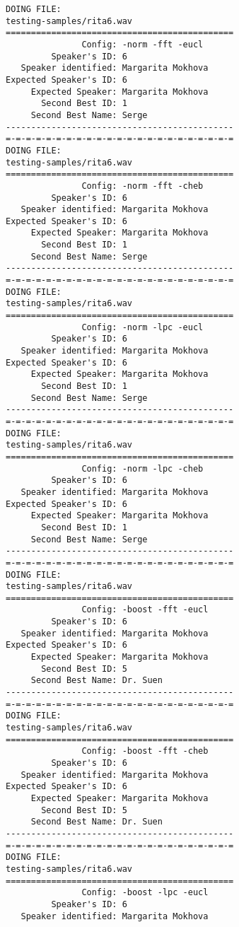 \begin{verbatim}
DOING FILE:
testing-samples/rita6.wav
=============================================
               Config: -norm -fft -eucl
         Speaker's ID: 6
   Speaker identified: Margarita Mokhova
Expected Speaker's ID: 6
     Expected Speaker: Margarita Mokhova
       Second Best ID: 1
     Second Best Name: Serge
---------------------------------------------
=-=-=-=-=-=-=-=-=-=-=-=-=-=-=-=-=-=-=-=-=-=-=
DOING FILE:
testing-samples/rita6.wav
=============================================
               Config: -norm -fft -cheb
         Speaker's ID: 6
   Speaker identified: Margarita Mokhova
Expected Speaker's ID: 6
     Expected Speaker: Margarita Mokhova
       Second Best ID: 1
     Second Best Name: Serge
---------------------------------------------
=-=-=-=-=-=-=-=-=-=-=-=-=-=-=-=-=-=-=-=-=-=-=
DOING FILE:
testing-samples/rita6.wav
=============================================
               Config: -norm -lpc -eucl
         Speaker's ID: 6
   Speaker identified: Margarita Mokhova
Expected Speaker's ID: 6
     Expected Speaker: Margarita Mokhova
       Second Best ID: 1
     Second Best Name: Serge
---------------------------------------------
=-=-=-=-=-=-=-=-=-=-=-=-=-=-=-=-=-=-=-=-=-=-=
DOING FILE:
testing-samples/rita6.wav
=============================================
               Config: -norm -lpc -cheb
         Speaker's ID: 6
   Speaker identified: Margarita Mokhova
Expected Speaker's ID: 6
     Expected Speaker: Margarita Mokhova
       Second Best ID: 1
     Second Best Name: Serge
---------------------------------------------
=-=-=-=-=-=-=-=-=-=-=-=-=-=-=-=-=-=-=-=-=-=-=
DOING FILE:
testing-samples/rita6.wav
=============================================
               Config: -boost -fft -eucl
         Speaker's ID: 6
   Speaker identified: Margarita Mokhova
Expected Speaker's ID: 6
     Expected Speaker: Margarita Mokhova
       Second Best ID: 5
     Second Best Name: Dr. Suen
---------------------------------------------
=-=-=-=-=-=-=-=-=-=-=-=-=-=-=-=-=-=-=-=-=-=-=
DOING FILE:
testing-samples/rita6.wav
=============================================
               Config: -boost -fft -cheb
         Speaker's ID: 6
   Speaker identified: Margarita Mokhova
Expected Speaker's ID: 6
     Expected Speaker: Margarita Mokhova
       Second Best ID: 5
     Second Best Name: Dr. Suen
---------------------------------------------
=-=-=-=-=-=-=-=-=-=-=-=-=-=-=-=-=-=-=-=-=-=-=
DOING FILE:
testing-samples/rita6.wav
=============================================
               Config: -boost -lpc -eucl
         Speaker's ID: 6
   Speaker identified: Margarita Mokhova

\end{verbatim}
